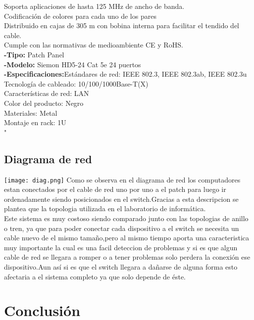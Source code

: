 \documentclass{udpreport}
\begin{document}
Soporta aplicaciones de hasta 125 MHz de ancho de banda.\\
Codificación de colores para cada uno de los pares\\
Distribuido en cajas de 305 m con bobina interna para facilitar el tendido del cable.\\
Cumple con las normativas de medioambiente CE y RoHS.\\
{\bf-Tipo:} Patch Panel\\
{\bf-Modelo:} Siemon HD5-24 Cat 5e 24 puertos\\
{\bf-Especificaciones:}Estándares de red: IEEE 802.3, IEEE 802.3ab, IEEE 802.3u\\
Tecnología de cableado: 10/100/1000Base-T(X)\\
Características de red: LAN\\
Color del producto: Negro\\
Materiales: Metal\\
Montaje en rack: 1U\\"
\section{Diagrama de red}
\texttt{[image: diag.png]}
Como se observa en el diagrama de red los computadores estan conectados por el cable de red uno por uno 
a el patch para luego ir ordenadamente siendo posicionados en el switch.Gracias a esta descripcion se 
plantea que la topologia utilizada en el laboratorio de informática. \\
Este sistema es muy costoso siendo comparado junto con las topologias de anillo o tren, ya que para poder
conectar cada dispositivo a el switch se necesita un cable nuevo de el mismo tamaño,pero al mismo tiempo
aporta una caracteristica muy importante la cual es una facil deteccion de problemas y si es que algun
cable de red se llegara a romper o a tener problemas solo perdera la conexión  ese dispositivo.Aun así 
si es que el switch llegara a dañarse de alguna forma esto afectaria a el sistema completo ya que solo
depende de éste.
\chapter{Conclusión}
\end{document}
